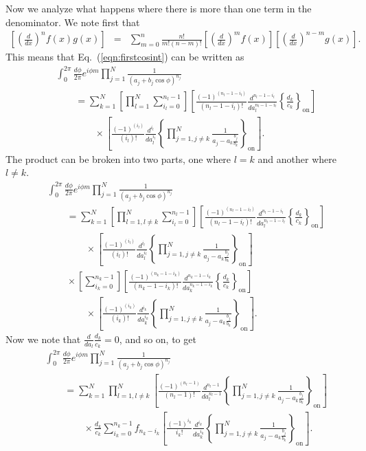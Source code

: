 \documentclass[aps,prc,preprint,tightenlines]{revtex4}
\begin{document}
Now we analyze what happens where there is more than one term in
the denominator. We note first that
\begin{eqnarray}
\left[ \left( \frac{d}{dx} \right)^n f(x)g(x) \right]
&=& \sum_{m=0}^n \frac{n!}{m!(n-m)!}
\left[\left( \frac{d}{dx} \right)^m     f(x)\right]
\left[\left( \frac{d}{dx} \right)^{n-m} g(x)\right].
\end{eqnarray}
This means that Eq.~(\ref{eqn:firstcosint}) can be written as
\begin{eqnarray}
&&\int_0^{2\pi} \frac{d\phi}{2\pi} e^{i \phi m} 
\prod_{j=1}^N \frac{1}{(a_j + b_j \cos\phi)^{n_j}} \nonumber\\
&&\qquad =
\sum_{k=1}^N
\left[\prod_{l=1}^N \sum_{i_l=0}^{n_l-1} \right]
\left[
\frac{(-1)^{(n_l-1-i_l)}}{(n_l-1-i_l)!} \frac{d^{n_l-1-i_l}}{d a_l^{n_l-1-i_l}}
\left\{ \frac{d_k}{c_k} \right\}_{\text{on}}
\right]
\nonumber\\&&\qquad\qquad \times
\left[
\frac{(-1)^{(i_l)}}{(i_l)!} \frac{d^{i_l}}{d a_l^{i_l}}
\left\{
\prod_{j=1,j\neq k}^N \frac{1}{a_j-a_k \frac{b_j}{b_k}}
\right\}_{\text{on}}
\right].
\end{eqnarray}
The product can be broken into two parts, one where $l=k$ and another
where $l\neq k$.
\begin{eqnarray}
&&\int_0^{2\pi} \frac{d\phi}{2\pi} e^{i \phi m} 
\prod_{j=1}^N \frac{1}{(a_j + b_j \cos\phi)^{n_j}} \nonumber\\
&&\qquad=
\sum_{k=1}^N
\left[\prod_{l=1,l\neq k}^N \sum_{i_l=0}^{n_l-1} \right]
\left[
\frac{(-1)^{(n_l-1-i_l)}}{(n_l-1-i_l)!} \frac{d^{n_l-1-i_l}}{d a_l^{n_l-1-i_l}}
\left\{ \frac{d_k}{c_k} \right\}_{\text{on}}
\right]
\nonumber\\&&\qquad\qquad \times
\left[
\frac{(-1)^{(i_l)}}{(i_l)!} \frac{d^{i_l}}{d a_l^{i_l}}
\left\{
\prod_{j=1,j\neq k}^N \frac{1}{a_j-a_k \frac{b_j}{b_k}}
\right\}_{\text{on}}
\right]
\nonumber\\&&\qquad
\times 
\left[\sum_{i_k=0}^{n_k-1} \right]
\left[
\frac{(-1)^{(n_k-1-i_k)}}{(n_k-1-i_k)!} \frac{d^{n_k-1-i_k}}{d a_k^{n_k-1-i_k}}
\left\{ \frac{d_k}{c_k} \right\}_{\text{on}}
\right]
\nonumber\\&&\qquad\qquad \times
\left[
\frac{(-1)^{(i_k)}}{(i_k)!} \frac{d^{i_k}}{d a_k^{i_k}}
\left\{
\prod_{j=1,j\neq k}^N \frac{1}{a_j-a_k \frac{b_j}{b_k}}
\right\}_{\text{on}}
\right].
\end{eqnarray}
Now we note that $\frac{d}{da_l}\frac{d_k}{c_k}=0$, and so on, to get
\begin{eqnarray}
&&\int_0^{2\pi} \frac{d\phi}{2\pi} e^{i \phi m} 
\prod_{j=1}^N \frac{1}{(a_j + b_j \cos\phi)^{n_j}} \nonumber\\
&&\qquad=
\sum_{k=1}^N
\prod_{l=1,l\neq k}^N 
\left[
\frac{(-1)^{(n_l-1)}}{(n_l-1)!} \frac{d^{n_l-1}}{d a_l^{n_l-1}}
\left\{
\prod_{j=1,j\neq k}^N \frac{1}{a_j-a_k \frac{b_j}{b_k}}
\right\}_{\text{on}}
\right]
\nonumber\\&&\qquad\qquad\times 
\frac{d_k}{c_k} \sum_{i_k=0}^{n_k-1} f_{n_k-i_k}
\left[
\frac{(-1)^{i_k}}{i_k!} \frac{d^{i_k}}{d a_k^{i_k}}
\left\{
\prod_{j=1,j\neq k}^N \frac{1}{a_j-a_k \frac{b_j}{b_k}}
\right\}_{\text{on}}
\right]. \label{eq:cibigthing}
\end{eqnarray}
\end{document}
